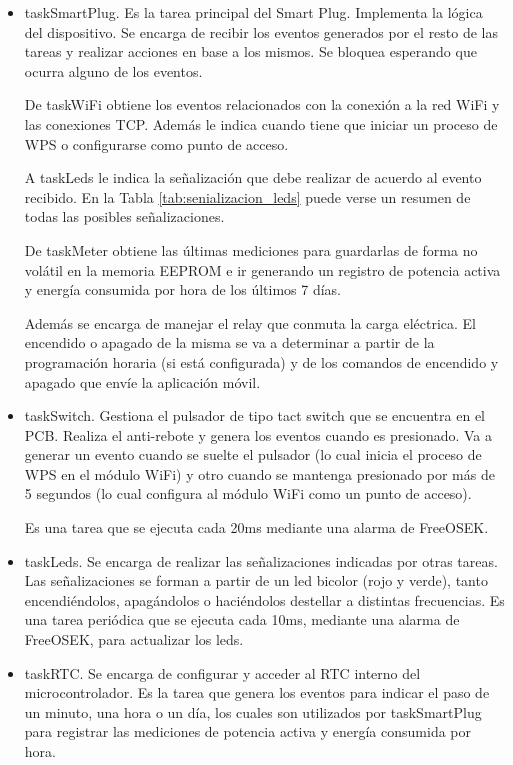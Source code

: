 \begin{itemize}
\item taskSmartPlug. Es la tarea principal del Smart Plug. Implementa la lógica del dispositivo. Se encarga de recibir los eventos generados por el resto de las tareas y realizar acciones en base a los mismos. Se bloquea esperando que ocurra alguno de los eventos. 

De taskWiFi obtiene los eventos relacionados con la conexión a la red WiFi y las conexiones TCP. Además le indica cuando tiene que iniciar un proceso de WPS o configurarse como punto de acceso.

A taskLeds le indica la señalización que debe realizar de acuerdo al evento recibido. En la Tabla \ref{tab:senializacion_leds} puede verse un resumen de todas las posibles señalizaciones.

De taskMeter obtiene las últimas mediciones para guardarlas de forma no volátil en la memoria EEPROM e ir generando un registro de potencia activa y energía consumida por hora de los últimos 7 días.

Además se encarga de manejar el relay que conmuta la carga eléctrica. El encendido o apagado de la misma se va a determinar a partir de la programación horaria (si está configurada) y de los comandos de encendido y apagado que envíe la aplicación móvil.

\item taskSwitch. Gestiona el pulsador de tipo tact switch que se encuentra en el PCB. Realiza el anti-rebote y genera los eventos cuando es presionado. Va a generar un evento cuando se suelte el pulsador (lo cual inicia el proceso de WPS en el módulo WiFi) y otro cuando se mantenga presionado por más de 5 segundos (lo cual configura al módulo WiFi como un punto de acceso). 

Es una tarea que se ejecuta cada 20ms mediante una alarma de FreeOSEK.


\item taskLeds. Se encarga de realizar las señalizaciones indicadas por otras tareas. Las señalizaciones se forman a partir de un led bicolor (rojo y verde), tanto encendiéndolos, apagándolos o haciéndolos destellar a distintas frecuencias.
Es una tarea periódica que se ejecuta cada 10ms, mediante una alarma de FreeOSEK, para actualizar los leds.


\item taskRTC. Se encarga de configurar y acceder al RTC interno del microcontrolador. Es la tarea que genera los eventos para indicar el paso de un minuto, una hora o un día, los cuales son utilizados por taskSmartPlug para registrar las mediciones de potencia activa y energía consumida por hora.


\end{itemize}

